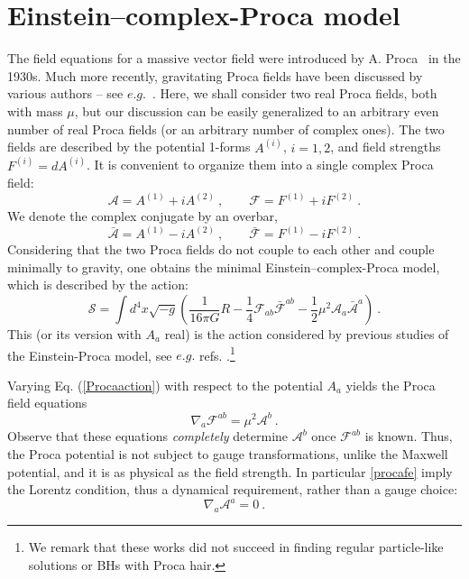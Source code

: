 \section{Einstein--complex-Proca model}
\label{Psec_model}
The field equations for a massive vector field were introduced by A. Proca~\cite{Proca} in the 1930s. Much more recently, gravitating Proca fields have been discussed by various authors -- see $e.g.$~\cite{Rosen:1994rq,Obukhov:1999ed,Toussaint:1999zz}. Here, we shall consider  two real Proca fields, both with mass $\mu$, but our discussion can be easily generalized to an arbitrary even number of real Proca fields (or an arbitrary number of complex ones). 
The two fields are described by the potential 1-forms $A^{(i)}$, $i=1,2$, and field strengths $F^{(i)}=dA^{(i)}$. It is convenient to organize them into a single complex Proca field:
\begin{equation}
\mathcal{A}=A^{(1)}+iA^{(2)} \ , \qquad \mathcal{F}=F^{(1)}+iF^{(2)} \ .
\end{equation}
We denote the complex conjugate by an overbar,
\begin{equation}
\bar{\mathcal{A}}=A^{(1)}-iA^{(2)} \ , \qquad \bar{\mathcal{F}}=F^{(1)}-iF^{(2)} \ .
\end{equation}
Considering that the two Proca fields do not couple to each other and couple minimally to gravity, one obtains the minimal Einstein--complex-Proca model, which is  
described by the action:
\begin{equation}
\label{Procaaction}
\mathcal{S}=\int d^4x \sqrt{-g}\left(\frac{1}{16 \pi  G}R
-\frac{1}{4}\mathcal{F}_{ab}\bar{\mathcal{F}}^{ab}
-\frac{1}{2}\mu^2\mathcal{A}_a\bar{\mathcal{A}}^a\right) \ .
\end{equation}
This (or its version with $A_a$ real) 
is the action considered by previous studies of the Einstein-Proca model, see
$e.g.$ refs. \cite{Rosen:1994rq,Vuille:2002qz}.\footnote{We remark that these works did not succeed in finding regular particle-like solutions or BHs with Proca hair.}

Varying Eq. (\ref{Procaaction}) with respect to the potential $A_a$ yields the Proca field equations
\begin{equation}
\nabla_a\mathcal{F}^{ab}=\mu^2 \mathcal{A}^b \ .
\label{procafe}
\end{equation}
Observe that these equations \textit{completely} determine $ \mathcal{A}^b$ once $\mathcal{F}^{ab}$ is known. Thus, the Proca potential is not subject to gauge transformations, unlike the Maxwell potential, and it is as physical as the field strength. In particular \eqref{procafe} imply the Lorentz condition, thus a dynamical requirement, rather than a gauge choice:
\begin{equation}
\nabla_a\mathcal{A}^a = 0 \ .
\label{lorentz}
\end{equation}


